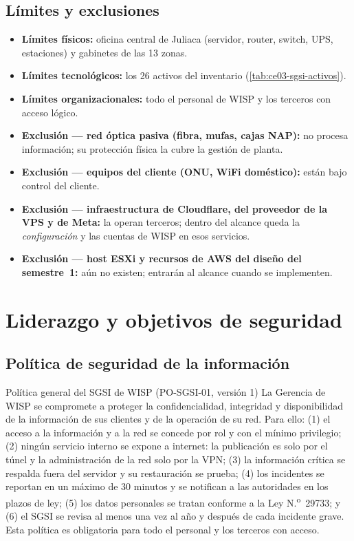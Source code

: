 \subsection{Límites y exclusiones}
\begin{itemize}
  \item \textbf{Límites físicos:} oficina central de Juliaca (servidor, router, switch,
  UPS, estaciones) y gabinetes de las 13 zonas.
  \item \textbf{Límites tecnológicos:} los 26 activos del inventario
  (\cref{tab:ce03-sgsi-activos}).
  \item \textbf{Límites organizacionales:} todo el personal de WISP y los terceros con
  acceso lógico.
  \item \textbf{Exclusión --- red óptica pasiva (fibra, mufas, cajas NAP):} no procesa
  información; su protección física la cubre la gestión de planta.
  \item \textbf{Exclusión --- equipos del cliente (ONU, WiFi doméstico):} están bajo control
  del cliente.
  \item \textbf{Exclusión --- infraestructura de Cloudflare, del proveedor de la VPS y de
  Meta:} la operan terceros; dentro del alcance queda la \emph{configuración} y las cuentas
  de WISP en esos servicios.
  \item \textbf{Exclusión --- host ESXi y recursos de AWS del diseño del semestre~1:} aún no
  existen; entrarán al alcance cuando se implementen.
\end{itemize}

\section{Liderazgo y objetivos de seguridad}

\subsection{Política de seguridad de la información}
\label{sec:ce03-sgsi-objetivos-pol}

\begin{upeubox}{Política general del SGSI de WISP (PO-SGSI-01, versión 1)}
La Gerencia de WISP se compromete a proteger la confidencialidad, integridad y
disponibilidad de la información de sus clientes y de la operación de su red. Para ello:
(1) el acceso a la información y a la red se concede por rol y con el mínimo privilegio;
(2) ningún servicio interno se expone a internet: la publicación es solo por el túnel y la
administración de la red solo por la VPN; (3) la información crítica se respalda fuera del
servidor y su restauración se prueba; (4) los incidentes se reportan en un máximo de 30
minutos y se notifican a las autoridades en los plazos de ley; (5) los datos personales se
tratan conforme a la Ley N.\textsuperscript{o}~29733; y (6) el SGSI se revisa al menos una vez
al año y después de cada incidente grave. Esta política es obligatoria para todo el
personal y los terceros con acceso.
\end{upeubox}

